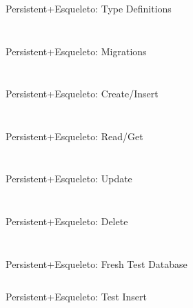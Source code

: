 \documentclass[hyperref={pdfpagelabels=false},12pt]{beamer}
\newcommand{\pygment}[3]{\inputminted[bgcolor=lightgray,linenos,fontsize=#1]{#2}{#3}}
\newcommand{\pygmentLines}[5]{\inputminted[bgcolor=lightgray,linenos,fontsize=#1,firstline=#2,lastline=#3,autogobble]{#4}{#5}}
\begin{document}
\begin{frame}{Persistent+Esqueleto: Type Definitions}
  \pygmentLines{\scriptsize}{15}{18}{haskell}{code/pers-esql/src/Person.hs}
  \vspace{-1.0cm}
  \pygmentLines{\scriptsize}{20}{37}{haskell}{code/pers-esql/src/Person.hs}
\end{frame}

\begin{frame}{Persistent+Esqueleto: Migrations}
  \pygmentLines{\scriptsize}{48}{49}{haskell}{code/pers-esql/src/Person.hs}
  \pygment{\scriptsize}{sql}{code/sql/createTable.sql}
\end{frame}

\begin{frame}{Persistent+Esqueleto: Create/Insert}
  \pygmentLines{\scriptsize}{51}{57}{haskell}{code/pers-esql/src/Person.hs}
  \pygment{\scriptsize}{sql}{code/sql/insertInto.sql}
\end{frame}

\begin{frame}{Persistent+Esqueleto: Read/Get}
  \pygmentLines{\scriptsize}{59}{67}{haskell}{code/pers-esql/src/Person.hs}
  \pygment{\scriptsize}{sql}{code/sql/selectWhere.sql}
\end{frame}

\begin{frame}{Persistent+Esqueleto: Update}
  \pygmentLines{\scriptsize}{69}{77}{haskell}{code/pers-esql/src/Person.hs}
  \pygment{\scriptsize}{sql}{code/sql/updateSetWhere.sql}
\end{frame}

\begin{frame}{Persistent+Esqueleto: Delete}
  \pygmentLines{\scriptsize}{79}{87}{haskell}{code/pers-esql/src/Person.hs}
  \pygment{\scriptsize}{sql}{code/sql/deleteWhere.sql}
\end{frame}

\begin{frame}{Persistent+Esqueleto: Fresh Test Database}
  \pygmentLines{\scriptsize}{19}{24}{haskell}{code/pers-esql/test/Spec.hs}
\end{frame}

\begin{frame}{Persistent+Esqueleto: Test Insert}
  \pygmentLines{\scriptsize}{28}{31}{haskell}{code/pers-esql/test/Spec.hs}
  \pygmentLines{\scriptsize}{40}{46}{haskell}{code/pers-esql/test/Spec.hs}
\end{frame}
\end{document}
